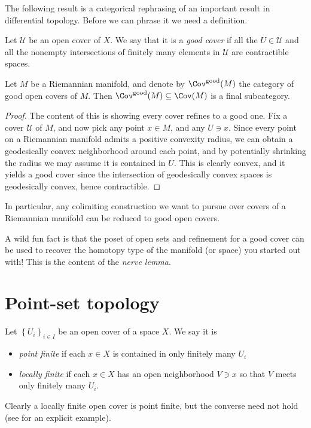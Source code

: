 \documentclass[11pt]{amsart}
\begin{document}
The following result is a categorical rephrasing of an important result in differential topology. Before we can phrase it we need a definition.

\begin{definition}\label{def:good-cover} Let $\mathcal{U}$ be an open cover of $X$. We say that it is a \emph{good cover} if all the $U\in \mathcal{U}$ and all the nonempty intersections of finitely many elements in $\mathcal{U}$ are contractible spaces.
\end{definition}

\begin{proposition}\label{prop:good-covers-final-in-covers-on-mfld} Let $M$ be a Riemannian manifold, and denote by $\Cov^\text{good}(M)$ the category of good open covers of $M$. Then $\Cov^\text{good}(M) \subseteq \Cov(M)$ is a final subcategory.
\end{proposition}
\begin{proof} The content of this is showing every cover refines to a good one. Fix a cover $\mathcal{U}$ of $M$, and now pick any point $x\in M$, and any $U \ni x$. Since every point on a Riemannian manifold admits a positive convexity radius, we can obtain a geodesically convex neighborhood around each point, and by potentially shrinking the radius we may assume it is contained in $U$. This is clearly convex, and it yields a good cover since the intersection of geodesically convex spaces is geodesically convex, hence contractible.
\end{proof}

In particular, any colimiting construction we want to pursue over covers of a Riemannian manifold can be reduced to good open covers.

A wild fun fact is that the poset of open sets and refinement for a good cover can be used to recover the homotopy type of the manifold (or space) you started out with! This is the content of the \emph{nerve lemma}.


\section{Point-set topology}

\begin{definition}\label{def:point-finite-versus-locally-finite} Let $\left\{ U_i \right\}_{i\in I}$ be an open cover of a space $X$. We say it is
\begin{itemize}
    \item \emph{point finite} if each $x\in X$ is contained in only finitely many $U_i$
    \item \emph{locally finite} if each $x\in X$ has an open neighborhood $V\ni x$ so that $V$ meets only finitely many $U_i$.
\end{itemize}
Clearly a locally finite open cover is point finite, but the converse need not hold (see \cite[p.~244]{Munkres} for an explicit example).
\end{definition}
\end{document}
